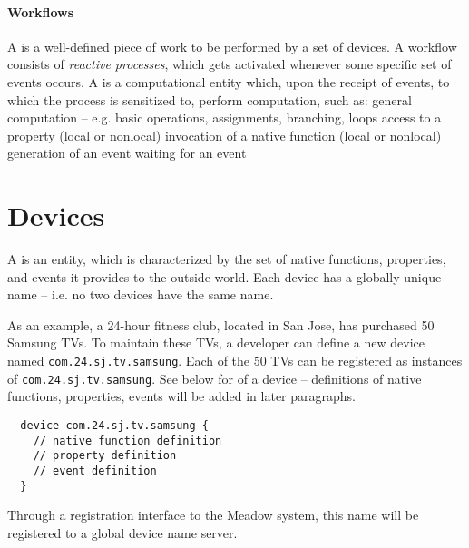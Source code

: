\documentclass{note}
\begin{document}
\paragraph{Workflows}
A  is a well-defined piece of work to be performed by a set of
devices. A workflow consists of {\em reactive processes\/}, which gets
activated whenever some specific set of events occurs.
A  is a computational entity which, upon
the receipt of events, to which the process is sensitized to, 
perform computation, such as:
\bit
\w general computation -- e.g. basic operations, assignments, branching,
  loops 
\w access to a property (local or nonlocal)
\w invocation of a native function (local or nonlocal)
\w generation of an event
\w waiting for an event
\eit



\section{Devices}
A  is an entity, which is characterized by the set of
native functions, properties, and events it provides to the outside world. 
Each device has a globally-unique name -- i.e. no two devices have the 
same name. 

As an example, a 24-hour fitness club, located in San Jose, has
purchased 50 Samsung TVs. To maintain these TVs, a developer can define
a new device named \verb+com.24.sj.tv.samsung+.
Each of the 50 TVs can be registered as instances of
\verb+com.24.sj.tv.samsung+.
See below for  of a device --  definitions of native
functions, properties, events will be added in later paragraphs.
\begin{verbatim}
  device com.24.sj.tv.samsung {
    // native function definition
    // property definition
    // event definition
  }
\end{verbatim}
Through a registration interface to the Meadow system, this name will be
registered to a global device name server.
\end{document}
